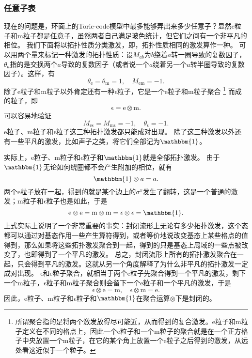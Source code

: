 \documentclass[hyperref, UTF8, a4paper]{ctexart}
\begin{document}
\subsubsection{任意子表}

现在的问题是，环面上的Toric-code模型中最多能够弄出来多少任意子？显然e粒子和m粒子都是任意子，虽然两者自己满足玻色统计，但它们之间有一个非平凡的相位。
我们下面将以拓扑性质分类激发，即，拓扑性质相同的激发算作一种。
可以用两个量来标记一种激发的拓扑性质：设$M_{ab}$为$b$绕着$a$转一圈导致的复数因子，$\theta_a$指的是交换两个$a$导致的复数因子（或者说一个$a$绕着另一个$a$转半圈导致的复数因子）。这样，有
\begin{equation}
    \theta_\mathrm{e} = \theta_\mathrm{m} = 1, \quad M_\mathrm{em} = - 1.
\end{equation}
除了e粒子和m粒子以外肯定还有一种$\mathrm{\epsilon}$粒子，它是一个e粒子和m粒子聚合%
\footnote{所谓聚合指的是将两个激发放得尽可能近，从而得到的复合激发。e粒子和m粒子定义在不同的格点上，因此一个e粒子和一个m粒子的聚合就是在一个正方格子中央放置一个m粒子，在它的某个角上放置一个e粒子之后得到的激发，从远处看这近似于一个粒子。}%
而成的粒子，即
\begin{equation}
    \mathrm{\epsilon} = \mathrm{e} \otimes \mathrm{m}.
\end{equation}
可以容易地验证
\begin{equation}
    M_\mathrm{e\epsilon} = M_\mathrm{m\epsilon} = -1, \quad \theta_\mathrm{\epsilon} = -1.
\end{equation}
e粒子、m粒子和$\mathrm{\epsilon}$粒子这三种拓扑激发都只能成对出现。
除了这三种激发以外还有一些平凡的激发，比如声子之类，将它们全部记为$\mathbbm{1}$。

实际上，e粒子、m粒子和$\epsilon$粒子和$\mathbbm{1}$就是全部拓扑激发。
由于$\mathbbm{1}$无论如何绕圈都不会产生附加的相位，就有
\[
    \mathbbm{1} \otimes a = a.
\]
两个e粒子放在一起，得到的就是某个边上的$\sigma^x$发生了翻转，这是一个普通的激发；m粒子和$\mathrm{\epsilon}$粒子也是如此，于是
\[
    \mathrm{e} \otimes \mathrm{e} = \mathrm{m} \otimes \mathrm{m} = \mathrm{\epsilon} \otimes \mathrm{\epsilon} = \mathbbm{1}.
\]
上式实际上说明了一个非常重要的事实：封闭流形上无论有多少拓扑激发，这个态都可以通过对基态作用一些产生算符得到，或者等价地说改变基态上某些格点的值得到，那么如果将这些拓扑激发聚合到一起，得到的只是基态上局域的一些点被改变了，也即得到了一个平凡的激发。
总之，封闭流形上所有的拓扑激发聚合在一起，只会得到平凡的激发。这就从另一个角度解释了为什么非平凡的拓扑激发一定成对出现。
$\mathrm{\epsilon}$和e粒子聚合，就相当于两个e粒子先聚合得到一个平凡的激发，剩下一个m粒子，$\mathrm{\epsilon}$粒子和m粒子聚合则会留下一个e粒子和一个平凡的激发，于是
\[
    \mathrm{\epsilon} \otimes \mathrm{e} = \mathrm{m}, \quad \mathrm{\epsilon} \otimes \mathrm{m} = \mathrm{e}.
\]
因此，e粒子、m粒子和$\epsilon$粒子和$\mathbbm{1}$在聚合运算$\otimes$下是封闭的。
\end{document}
